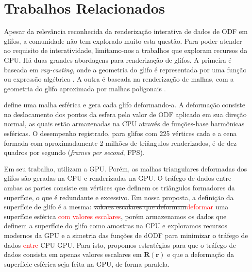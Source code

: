 \section{Trabalhos Relacionados}
\label{sec::trabalhos_relacionados}

Apesar da relevância reconhecida da renderização interativa de dados de ODF em glifos, a comunidade não tem explorado muito esta questão. Para poder atender ao requisito de interatividade, limitamo-nos a trabalhos que exploram recursos da GPU. Há duas grandes abordagens para renderização de glifos. A primeira é baseada em \textit{ray-casting}, onde a geometria do glifo é representada por uma função ou expressão algébrica \cite{peeters2009, almsick2011}. A outra é baseada na renderização de malhas, com a geometria do glifo aproximada por malhas poligonais \cite{shattuck2008}.

 define uma malha esférica e gera cada glifo deformando-a. A deformação consiste no deslocamento dos pontos da esfera pelo valor de ODF aplicado em sua direção normal, as quais estão armazenadas na CPU através de funções-base harmônicas esféricas. O desempenho registrado, para glifos com 225 vértices cada e a cena formada com aproximadamente 2 milhões de triângulos renderizados, é de dez quadros por segundo (\textit{frames per second}, FPS).


Em seu trabalho,  utilizam a GPU. Porém, as malhas triangulares deformadas dos glifos são geradas na CPU e renderizadas na GPU. O tráfego de dados entre ambas as partes consiste em vértices que definem os triângulos formadores da superfície, o que é redundante e excessivo. Em nossa proposta, a definição da superfície de glifo é a mesma: \sout{valores escalares que deformam}\textcolor{red}{deformar} uma superfície esférica \textcolor{red}{com valores escalares}, porém armazenamos os dados que definem a superfície do glifo como amostras na CPU e exploramos recursos modernos da GPU e a simetria das funções de dODF para minimizar o tráfego de dados \textcolor{red}{entre} CPU-GPU. Para isto, propomos estratégias para que o tráfego de dados consista em apenas valores escalares em $\mathbf{R}(\mathbf{r})$ e que a deformação da superfície esférica seja feita na GPU, de forma paralela.

